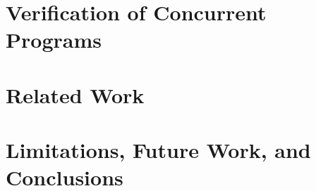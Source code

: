 \documentclass[letterpaper,11pt]{yalephd}
\begin{document}
\chapter{Verification of Concurrent Programs}
\label{chapter:concurrent}



\chapter{Related Work}
\label{chapter:related}

\chapter{Limitations, Future Work, and Conclusions}
\label{chapter:conclusion}







%
%
%

\backmatter


\end{document}
